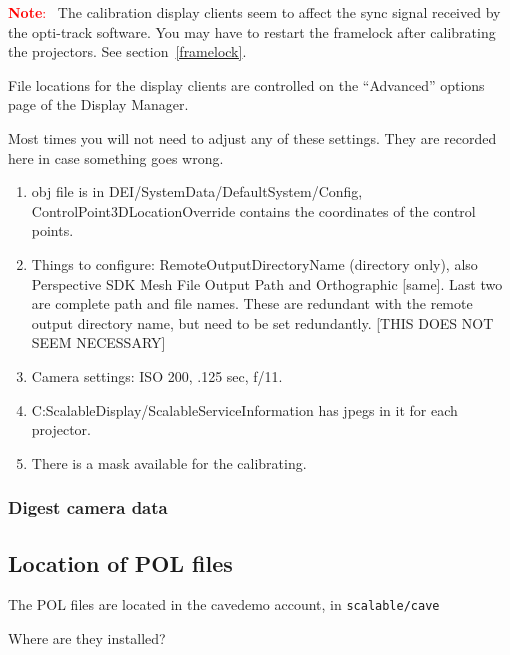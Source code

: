 \documentclass[11pt]{article}
\newenvironment{note}[1][Note]{\begin{lrbox}{\notebox}%
    \begin{minipage}{0.9\columnwidth}\textcolor{red}{\textbf{#1}:~}}%
    {\end{minipage}\end{lrbox}\begin{center}\setlength{\fboxsep}{8pt}%
    \fbox{\usebox{\notebox}}\end{center}}
\newcommand{\cmd}[1]{\texttt{#1}}
\begin{document}
\begin{note}
  The calibration display clients seem to affect the sync signal
  received by the opti-track software.  You may have to restart the
  framelock after calibrating the projectors.  See
  section~\ref{framelock}.
\end{note}




File locations for the display clients are controlled on the
``Advanced'' options page of the Display Manager.

Most times you will not need to adjust any of these settings.  They
are recorded here in case something goes wrong.

\begin{enumerate}
\item obj file is in DEI/SystemData/DefaultSystem/Config,
  ControlPoint3DLocationOverride contains the coordinates of the
  control points.

\item Things to configure: RemoteOutputDirectoryName (directory only),
  also Perspective SDK Mesh File Output Path and Orthographic [same].
  Last two are complete path and file names.  These are redundant with
  the remote output directory name, but need to be set redundantly.
  [THIS DOES NOT SEEM NECESSARY]

\item Camera settings: ISO 200, .125 sec, f/11.

\item C:ScalableDisplay/ScalableServiceInformation has jpegs in it for
  each projector.

\item There is a mask available for the calibrating.
\end{enumerate}








\subsubsection{Digest camera data}

\subsection{Location of POL files}

The POL files are located in the cavedemo account, in \cmd{scalable/cave}


Where are they installed?
\end{document}
